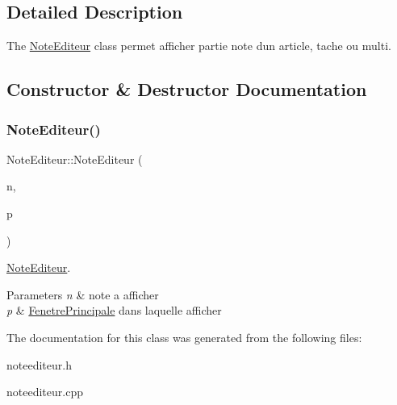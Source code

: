 \subsection{Detailed Description}
The \hyperlink{class_note_editeur}{Note\+Editeur} class permet afficher partie note d\textquotesingle{}un article, tache ou multi. 

\subsection{Constructor \& Destructor Documentation}
\mbox{\label{class_note_editeur_a5488a0e9553714cf8232f9ca56305e23}} 
\subsubsection{\texorpdfstring{Note\+Editeur()}{NoteEditeur()}}
{\footnotesize\ttfamily Note\+Editeur\+::\+Note\+Editeur (\begin{DoxyParamCaption}\item[{\hyperlink{class_notes}{Notes} \&}]{n,  }\item[{\hyperlink{class_fenetre_principale}{Fenetre\+Principale} $\ast$}]{p }\end{DoxyParamCaption})}



\hyperlink{class_note_editeur}{Note\+Editeur}. 


\begin{DoxyParams}{Parameters}
{\em n} & note a afficher \\
\hline
{\em p} & \hyperlink{class_fenetre_principale}{Fenetre\+Principale} dans laquelle afficher \\
\hline
\end{DoxyParams}


The documentation for this class was generated from the following files\+:\begin{DoxyCompactItemize}
\item 
noteediteur.\+h\item 
noteediteur.\+cpp\end{DoxyCompactItemize}
